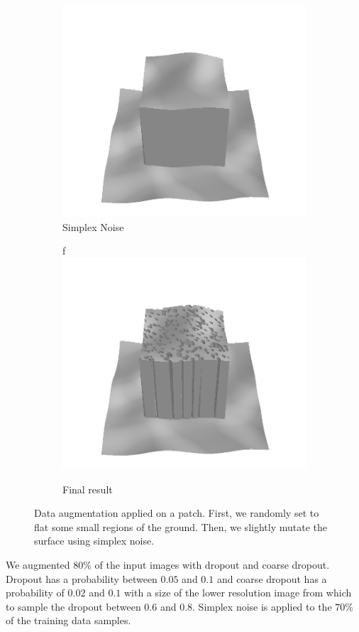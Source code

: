 \documentclass[../document.tex]{subfiles}
\begin{document}
\begin{figure}[htbp]
          \begin{subfigure}[b]{0.32\textwidth}
            \includegraphics[width=\textwidth]{../img/data-aug/3d/center-simplex-mayavi.png}
            \caption{Simplex Noise}

        \end{subfigure}    
        \begin{subfigure}[b]{0.32\textwidth}f
            \includegraphics[width=\textwidth]{../img/data-aug/3d/center-final-mayavi.png}
            \caption{Final result}
        \end{subfigure}    
    \label{fig: data-aug}
    \caption{Data augmentation applied on a patch. First, we randomly set to flat some small regions of the ground. Then, we slightly mutate the surface using simplex noise.}    
\end{figure}
We augmented $80\%$ of the input images with dropout and coarse dropout. Dropout has a probability between $0.05$ and $0.1$ and coarse dropout has a probability of $0.02$ and $0.1$ with a size of the lower resolution image from which to sample the dropout between $0.6$ and $0.8$. Simplex noise is applied to the $70\%$ of the training data samples.
\end{document}
